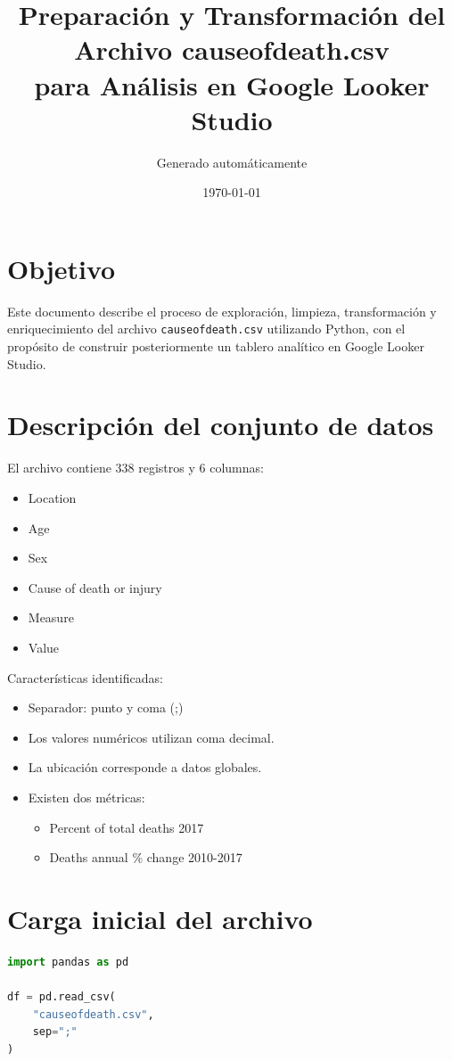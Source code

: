 \documentclass[12pt,a4paper]{article}
\title{Preparación y Transformación del Archivo causeofdeath.csv\\para Análisis en Google Looker Studio}
\author{Generado automáticamente}
\date{\today}
\begin{document}
\maketitle

\section{Objetivo}
Este documento describe el proceso de exploración, limpieza, transformación y enriquecimiento del archivo \texttt{causeofdeath.csv} utilizando Python, con el propósito de construir posteriormente un tablero analítico en Google Looker Studio.

\section{Descripción del conjunto de datos}
El archivo contiene 338 registros y 6 columnas:

\begin{itemize}
\item Location
\item Age
\item Sex
\item Cause of death or injury
\item Measure
\item Value
\end{itemize}

Características identificadas:

\begin{itemize}
\item Separador: punto y coma (;)
\item Los valores numéricos utilizan coma decimal.
\item La ubicación corresponde a datos globales.
\item Existen dos métricas:
    \begin{itemize}
    \item Percent of total deaths 2017
    \item Deaths annual \% change 2010-2017
    \end{itemize}
\end{itemize}

\section{Carga inicial del archivo}

\begin{lstlisting}[language=Python]
import pandas as pd

df = pd.read_csv(
    "causeofdeath.csv",
    sep=";"
)
\end{lstlisting}
\end{document}
